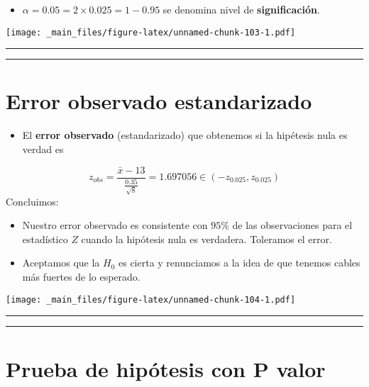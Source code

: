 \documentclass[
]{book}
\providecommand{\tightlist}{%
  \setlength{\itemsep}{0pt}\setlength{\parskip}{0pt}}
\begin{document}
\begin{itemize}
\tightlist
\item
  \(\alpha=0.05=2\times 0.025=1-0.95\) se denomina nivel de \textbf{significación}.
\end{itemize}

\texttt{[image: \_main\_files/figure-latex/unnamed-chunk-103-1.pdf]}

\begin{center}\rule{0.5\linewidth}{0.5pt}\end{center}

\begin{center}\rule{0.5\linewidth}{0.5pt}\end{center}

\hypertarget{error-observado-estandarizado}{%
\section{Error observado estandarizado}\label{error-observado-estandarizado}}

\begin{itemize}
\tightlist
\item
  El \textbf{error observado} (estandarizado) que obtenemos si la hipétesis nula es verdad es
\end{itemize}

\[z_{obs}=\frac{\bar{x}-13}{\frac{0.35}{\sqrt{8}}}=1.697056 \in (-z_{0.025}, z_{0.025})\]
Concluimos:

\begin{itemize}
\item
  Nuestro error observado es consistente con \(95\%\) de las observaciones para el estadístico \(Z\) cuando la hipótesis nula es verdadera. Toleramos el error.
\item
  Aceptamos que la \(H_0\) es cierta y renunciamos a la idea de que tenemos cables más fuertes de lo esperado.
\end{itemize}

\texttt{[image: \_main\_files/figure-latex/unnamed-chunk-104-1.pdf]}

\begin{center}\rule{0.5\linewidth}{0.5pt}\end{center}

\begin{center}\rule{0.5\linewidth}{0.5pt}\end{center}

\hypertarget{prueba-de-hipuxf3tesis-con-p-valor}{%
\section{Prueba de hipótesis con P valor}\label{prueba-de-hipuxf3tesis-con-p-valor}}
\end{document}
